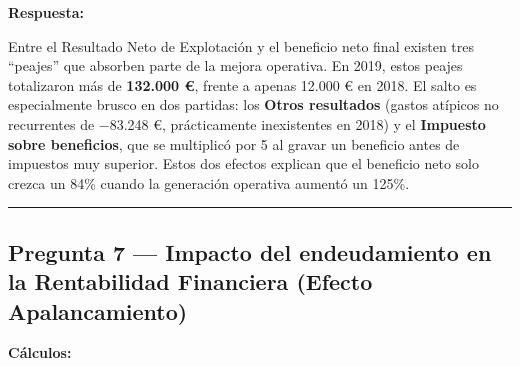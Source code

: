 \documentclass[12pt]{book} %
\begin{document}
\textbf{Respuesta:}

Entre el Resultado Neto de Explotación y el beneficio neto final existen
tres ``peajes'' que absorben parte de la mejora operativa. En 2019,
estos peajes totalizaron más de \textbf{132.000 €}, frente a apenas
12.000 € en 2018. El salto es especialmente brusco en dos partidas: los
\textbf{Otros resultados} (gastos atípicos no recurrentes de −83.248 €,
prácticamente inexistentes en 2018) y el \textbf{Impuesto sobre
beneficios}, que se multiplicó por 5 al gravar un beneficio antes de
impuestos muy superior. Estos dos efectos explican que el beneficio neto
solo crezca un 84\% cuando la generación operativa aumentó un 125\%.

\begin{center}\rule{0.5\linewidth}{0.5pt}\end{center}

\hypertarget{pregunta-7-impacto-del-endeudamiento-en-la-rentabilidad-financiera-efecto-apalancamiento}{%
\subsection{Pregunta 7 --- Impacto del endeudamiento en la Rentabilidad
Financiera (Efecto
Apalancamiento)}\label{pregunta-7-impacto-del-endeudamiento-en-la-rentabilidad-financiera-efecto-apalancamiento}}

\textbf{Cálculos:}
\end{document}

